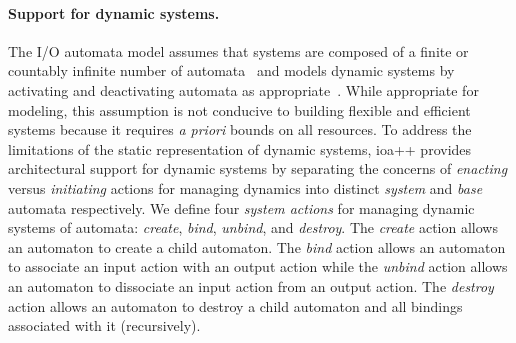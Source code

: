 
\paragraph*{Support for dynamic systems.}
The I/O automata model assumes that systems are composed of a finite or countably infinite number of automata~\cite{lynch1996distributed} and models dynamic systems by activating and deactivating automata as appropriate~\cite{lynch1994atomic}.
While appropriate for modeling, this assumption is not conducive to building flexible and efficient systems because it requires \emph{a priori} bounds on all resources.
To address the limitations of the static representation of dynamic systems, ioa++ provides architectural support for dynamic systems by separating the concerns of \emph{enacting} versus \emph{initiating} actions for managing dynamics into distinct \emph{system} and \emph{base} automata respectively.
We define four \emph{system actions} for managing dynamic systems of automata: \emph{create}, \emph{bind}, \emph{unbind}, and \emph{destroy}.
The \emph{create} action allows an automaton to create a child automaton.
The \emph{bind} action allows an automaton to associate an input action with an output action while the \emph{unbind} action allows an automaton to dissociate an input action from an output action.
The \emph{destroy} action allows an automaton to destroy a child automaton and all bindings associated with it (recursively).

